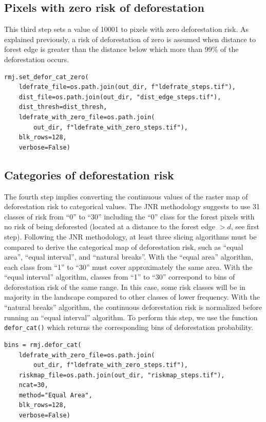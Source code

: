 \documentclass[paper=a4, 12pt, DIV=12]{scrartcl}
\begin{document}
\subsection{Pixels with zero risk of deforestation}
\label{sec:orgd415b45}

This third step sets a value of 10001 to pixels with zero deforestation risk. As explained previously, a risk of deforestation of zero is assumed when distance to forest edge is greater than the distance below which more than 99\% of the deforestation occurs.

\begin{verbatim}
rmj.set_defor_cat_zero(
    ldefrate_file=os.path.join(out_dir, f"ldefrate_steps.tif"),
    dist_file=os.path.join(out_dir, "dist_edge_steps.tif"),
    dist_thresh=dist_thresh,
    ldefrate_with_zero_file=os.path.join(
        out_dir, f"ldefrate_with_zero_steps.tif"),
    blk_rows=128,
    verbose=False)
\end{verbatim}

\subsection{Categories of deforestation risk}
\label{sec:orgeb91e51}

The fourth step implies converting the continuous values of the raster map of deforestation risk to categorical values. The JNR methodology suggests to use 31 classes of risk from ``0'' to ``30'' including the ``0'' class for the forest pixels with no risk of being deforested (located at a distance to the forest edge \(> d\), see first step). Following the JNR methodology, at least three slicing algorithms must be compared to derive the categorical map of deforestation risk, such as ``equal area'', ``equal interval'', and ``natural breaks''. With the ``equal area'' algorithm, each class from ``1'' to ``30'' must cover approximately the same area. With the ``equal interval'' algorithm, classes from ``1'' to ``30'' correspond to bins of deforestation risk of the same range. In this case, some risk classes will be in majority in the landscape compared to other classes of lower frequency. With the ``natural breaks'' algorithm, the continuous deforestation risk is normalized before running an ``equal interval'' algorithm. To perform this step, we use the function \texttt{defor\_cat()} which returns the corresponding bins of deforestation probability.

\begin{verbatim}
bins = rmj.defor_cat(
    ldefrate_with_zero_file=os.path.join(
        out_dir, f"ldefrate_with_zero_steps.tif"),
    riskmap_file=os.path.join(out_dir, "riskmap_steps.tif"),
    ncat=30,
    method="Equal Area",
    blk_rows=128,
    verbose=False)
\end{verbatim}
\end{document}
